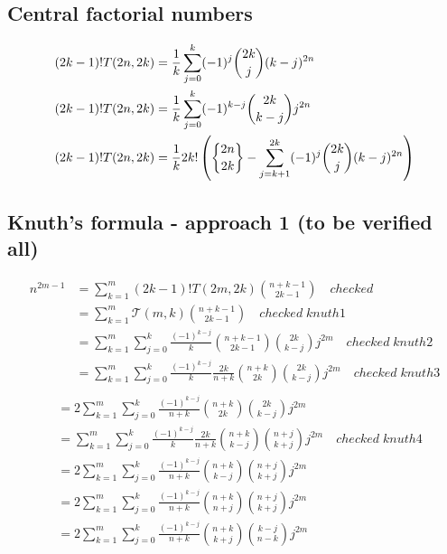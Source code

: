 \subsection{Central factorial numbers}\label{subsec:central-factorial-numbers}
\begin{align*}
(2k-1)
    ! T(2n,2k) &= \frac{1}{k} \sum_{j=0}^{k} (-1)^j \binom{2k}{j} (k-j)^{2n} \\
    (2k-1)! T(2n,2k) &= \frac{1}{k} \sum_{j=0}^{k} (-1)^{k-j} \binom{2k}{k-j} j^{2n} \\
    (2k-1)! T(2n,2k) &= \frac{1}{k} 2k! \left( \stirlingii{2n}{2k} -  \sum_{j=k+1}^{2k} (-1)^j \binom{2k}{j} (k-j)^{2n}\right) \\
\end{align*}

\subsection{Knuth's formula - approach 1 (to be verified all)}\label{subsec:knuth's-formula---approach-1-(to-be-verified-all)}
\begin{align*}
    n^{2m-1}
    &= \sum_{k=1}^{m} (2k-1)! T(2m,2k) \binom{n+k-1}{2k-1} \quad checked \\
    &= \sum_{k=1}^{m} \mathcal{T}(m,k) \binom{n+k-1}{2k-1} \quad checked \;  knuth1\\
    &= \sum_{k=1}^{m} \sum_{j=0}^{k} \frac{(-1)^{k-j}}{k} \binom{n+k-1}{2k-1} \binom{2k}{k-j} j^{2m} \quad checked \; knuth2 \\
    &= \sum_{k=1}^{m} \sum_{j=0}^{k} \frac{(-1)^{k-j}}{k} \frac{2k}{n+k} \binom{n+k}{2k} \binom{2k}{k-j} j^{2m} \quad checked \; knuth3 \\
\end{align*}
\begin{align*}
    &= 2\sum_{k=1}^{m} \sum_{j=0}^{k} \frac{(-1)^{k-j}}{n+k} \binom{n+k}{2k} \binom{2k}{k-j} j^{2m}  \\
    &= \sum_{k=1}^{m} \sum_{j=0}^{k} \frac{(-1)^{k-j}}{k} \frac{2k}{n+k} \binom{n+k}{k-j} \binom{n+j}{k+j} j^{2m} \quad checked \; knuth4 \\
    &= 2\sum_{k=1}^{m} \sum_{j=0}^{k} \frac{(-1)^{k-j}}{n+k} \binom{n+k}{k-j} \binom{n+j}{k+j} j^{2m} \\
    &= 2\sum_{k=1}^{m} \sum_{j=0}^{k} \frac{(-1)^{k-j}}{n+k} \binom{n+k}{n+j} \binom{n+j}{k+j} j^{2m} \\
    &= 2\sum_{k=1}^{m} \sum_{j=0}^{k} \frac{(-1)^{k-j}}{n+k} \binom{n+k}{k+j} \binom{k-j}{n-k} j^{2m} \\
\end{align*}

